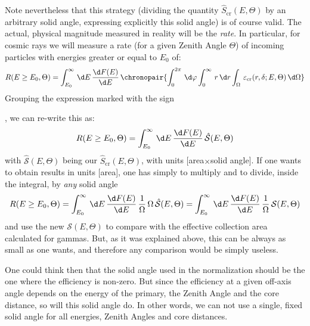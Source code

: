 Note nevertheless that this strategy (dividing the quantity
$\hat{S}_{\mathrm{cr}}(E,\Theta)$ by an arbitrary solid angle,
expressing explicitly this solid angle) is of course valid. The
actual, physical magnitude measured in reality will be the
\emph{rate}. In particular, for cosmic rays we will measure a rate
(for a given Zenith Angle $\Theta$) of incoming particles with
energies greater or equal to $E_0$ of:
%
\begin{equation}
  \label{eq:Rcr}
  R(E\geq E_0,\Theta) = 
  \int_{E_0}^{\infty}\,\d E\,\frac{\d F(E)}{\d E}\,
  \chronopair{
  \int_0^{2\pi}\,\d \varphi 
  \int_0^{\infty}\,r\,\d r 
  \int_{\Omega}\,\varepsilon_{\mathrm{cr}}(r,\delta;E,\Theta)\,\d \Omega}
\end{equation}
%
Grouping the expression marked with the sign
{\raisebox{6pt}{$\chronopair{\quad}$}\thickspace, we can re-write this
  as:
%
\begin{equation}
  \label{eq:Rcrbis}
  R(E\geq E_0,\Theta) = 
  \int_{E_0}^{\infty}\,\d E\,\frac{\d F(E)}{\d E}\,\hat{\mathcal{S}}(E,\Theta)
\end{equation}
%
with $\hat{\mathcal{S}}(E,\Theta)$ being our
$\hat{S}_{\mathrm{cr}}(E,\Theta)$, with units [area$\times$solid
angle]. If one wants to obtain results in units [area], one has simply
to multiply and to divide, inside the integral, by \emph{any} solid
angle
%
\begin{equation}
  \label{eq:Rcrtris}
  R(E\geq E_0,\Theta) = 
  \int_{E_0}^{\infty}\,\d E\,\frac{\d F(E)}{\d E}\,
  \frac{1}{\Omega}\,\Omega\,\hat{\mathcal{S}}(E,\Theta) =
  \int_{E_0}^{\infty}\,\d E\,\frac{\d F(E)}{\d E}\,
  \frac{1}{\Omega}\,\mathcal{S}(E,\Theta)
\end{equation}
%
and use the new $\mathcal{S}(E,\Theta)$ to compare with the effective
collection area calculated for gammas. But, as it was explained above,
this can be always as small as one wants, and therefore any comparison
would be simply useless.

One could think then that the solid angle used in the normalization
should be the one where the efficiency is non-zero. But since the
efficiency at a given off-axis angle depends on the energy of the
primary, the Zenith Angle and the core distance, so will this solid
angle do. In other words, we can not use a single, fixed solid angle
for all energies, Zenith Angles and core distances.

}

